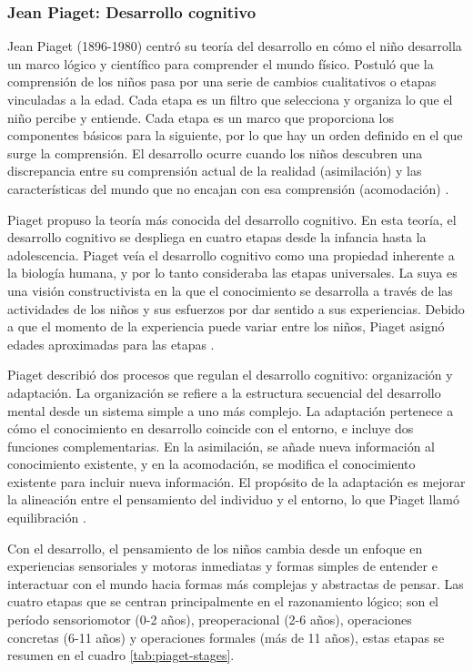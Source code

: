 \subsubsection{Jean Piaget: Desarrollo cognitivo}
Jean Piaget (1896-1980) centró su teoría del desarrollo en cómo el niño
desarrolla un marco lógico y científico para comprender el mundo físico.
Postuló que la comprensión de los niños pasa por una serie de cambios
cualitativos o etapas vinculadas a la edad. Cada etapa es un filtro que
selecciona y organiza lo que el niño percibe y entiende. Cada etapa es un marco
que proporciona los componentes básicos para la siguiente, por lo que hay un
orden definido en el que surge la comprensión. El desarrollo ocurre cuando los
niños descubren una discrepancia entre su comprensión actual de la realidad
(asimilación) y las características del mundo que no encajan con esa
comprensión (acomodación) \cite{Feldman3}.

Piaget propuso la teoría más conocida del desarrollo cognitivo. En esta teoría,
el desarrollo cognitivo se despliega en cuatro etapas desde la infancia hasta
la adolescencia. Piaget veía el desarrollo cognitivo como una propiedad
inherente a la biología humana, y por lo tanto consideraba las etapas
universales. La suya es una visión constructivista en la que el conocimiento se
desarrolla a través de las actividades de los niños y sus esfuerzos por dar
sentido a sus experiencias. Debido a que el momento de la experiencia puede
variar entre los niños, Piaget asignó edades aproximadas para las etapas
\cite{Gauvain2022}.

Piaget describió dos procesos que regulan el desarrollo cognitivo: organización
y adaptación. La organización se refiere a la estructura secuencial del
desarrollo mental desde un sistema simple a uno más complejo. La adaptación
pertenece a cómo el conocimiento en desarrollo coincide con el entorno, e
incluye dos funciones complementarias. En la asimilación, se añade nueva
información al conocimiento existente, y en la acomodación, se modifica el
conocimiento existente para incluir nueva información. El propósito de la
adaptación es mejorar la alineación entre el pensamiento del individuo y el
entorno, lo que Piaget llamó equilibración \cite{Gauvain2022}.

Con el desarrollo, el pensamiento de los niños cambia desde un enfoque en
experiencias sensoriales y motoras inmediatas y formas simples de entender e
interactuar con el mundo hacia formas más complejas y abstractas de pensar. Las
cuatro etapas que se centran principalmente en el razonamiento lógico; son el
período sensoriomotor (0-2 años), preoperacional (2-6 años), operaciones
concretas (6-11 años) y operaciones formales (más de 11 años),
\cite{Gauvain2022} estas etapas se resumen en el cuadro \ref{tab:piaget-stages}.

